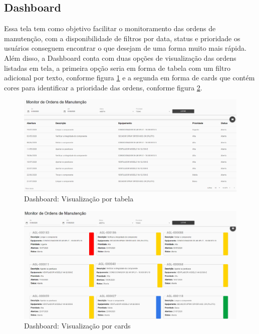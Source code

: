 \subsection{Dashboard}

Essa tela tem como objetivo facilitar o monitoramento das ordens de manutenção, com a disponibilidade de filtros por data, status e prioridade os usuários conseguem encontrar o que desejam de uma forma muito mais rápida. Além disso, a Dashboard conta com duas opções de visualização das ordens listadas em tela, a primeira opção seria em forma de tabela com um filtro adicional por texto, conforme figura \ref{web-monitor-lista} e a segunda em forma de cards que contém cores para identificar a prioridade das ordens, conforme figura \ref{web-monitor-cards}.

\begin{figure}[H]
	\caption{\label{web-monitor-lista}Dashboard: Visualização por tabela}
	\begin{center}
		\includegraphics[scale=0.34]{./Figuras/agil.it/web-monitor-lista.png}
	\end{center}
\end{figure}

\begin{figure}[H]
	\caption{\label{web-monitor-cards}Dashboard: Visualização por cards}
	\begin{center}
		\includegraphics[scale=0.34]{./Figuras/agil.it/web-monitor-cards.png}
	\end{center}
\end{figure}

